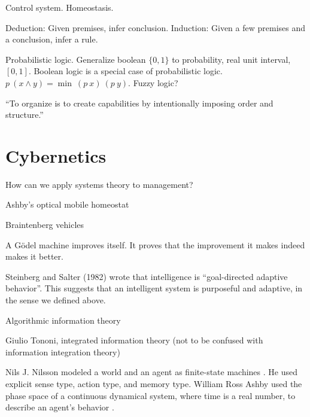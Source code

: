Control system. Homeostasis.

Deduction: Given premises, infer conclusion.
Induction: Given a few premises and a conclusion, infer a rule.

Probabilistic logic.
Generalize boolean \(\{0,1\}\) to probability, real unit interval, \([0,1]\).
Boolean logic is a special case of probabilistic logic.
\(p~(x \wedge y) = \min~(p~x)~(p~y)\).
Fuzzy logic?

``To organize is to create capabilities by intentionally imposing order and structure.'' \cite{Organ}

\section{Cybernetics}

How can we apply systems theory to management? \cite{SystemManage}

Ashby's optical mobile homeostat
\cite{BattleHom}
\cite{BattleThree}

Braintenberg vehicles

A G\"odel machine improves itself.
It proves that the improvement it makes indeed makes it better.
\cite{GodelMachImpl}


Steinberg and Salter (1982)
wrote that intelligence is ``goal-directed adaptive behavior''.
This suggests that an intelligent system is purposeful and adaptive,
in the sense we defined above.


\cite{PickeringCyber}
\cite{GoertzelAgi}
\cite{SlomanTuringIrrelevance}

Algorithmic information theory
\cite{AlgoInfTh}

Giulio Tononi, integrated information theory
(not to be confused with information integration theory)

Nils J. Nilsson modeled a world and an agent as finite-state machines \cite{NilsLogicAi}.
He used explicit sense type, action type, and memory type.
William Ross Ashby used the phase space of a continuous dynamical system,
where time is a real number,
to describe an agent's behavior \cite{AshbyBrain}.

